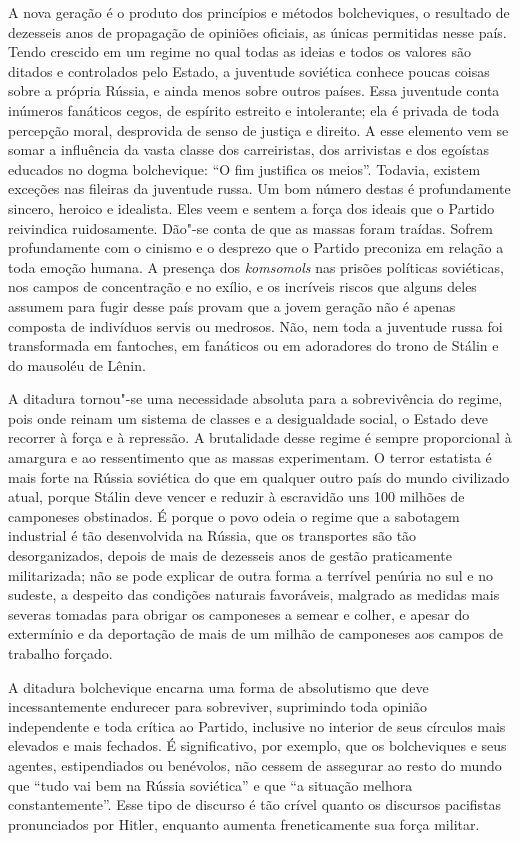 A nova geração é o produto dos princípios e métodos bolcheviques, o
resultado de dezesseis anos de propagação de opiniões oficiais, as únicas
permitidas nesse país. Tendo crescido em um regime no qual
todas as ideias e todos os valores são ditados e controlados pelo
Estado, a juventude soviética conhece poucas coisas sobre a própria
Rússia, e ainda menos sobre outros países. Essa juventude conta
inúmeros fanáticos cegos, de espírito estreito e intolerante; ela é
privada de toda percepção moral, desprovida de senso de justiça e
direito. A esse elemento vem se somar a influência da vasta classe dos
carreiristas, dos arrivistas e dos egoístas educados no dogma
bolchevique: “O fim justifica os meios”. Todavia, existem exceções nas
fileiras da juventude russa. Um bom número destas é profundamente
sincero, heroico e idealista. Eles veem e sentem a força dos ideais que
o Partido reivindica ruidosamente. Dão"-se conta de que as massas
foram traídas. Sofrem profundamente com o cinismo e o desprezo que o
Partido preconiza em relação a toda emoção humana. A presença dos
\textit{komsomols} nas prisões políticas soviéticas, nos campos de concentração
e no exílio, e os incríveis riscos que alguns deles assumem para fugir
desse país provam que a jovem geração não é apenas composta de
indivíduos servis ou medrosos. Não, nem toda a juventude russa foi
transformada em fantoches, em fanáticos ou em adoradores do trono de
Stálin e do mausoléu de Lênin.

A ditadura tornou"-se uma necessidade absoluta para a sobrevivência do
regime, pois onde reinam um sistema de classes e a desigualdade
social, o Estado deve recorrer à força e à repressão. A brutalidade desse
regime é sempre proporcional à amargura e ao ressentimento que as
massas experimentam. O terror estatista é mais forte na Rússia
soviética do que em qualquer outro país do mundo civilizado atual,
porque Stálin deve vencer e reduzir à escravidão uns 100 milhões de
camponeses obstinados. É porque o povo odeia o regime que a sabotagem
industrial é tão desenvolvida na Rússia, que os transportes são tão
desorganizados, depois de mais de dezesseis anos de gestão praticamente
militarizada; não se pode explicar de outra forma a terrível penúria no
sul e no sudeste, a despeito das condições naturais favoráveis,
malgrado as medidas mais severas tomadas para obrigar os camponeses a
semear e colher, e apesar do extermínio e da deportação de mais de um
milhão de camponeses aos campos de trabalho forçado.

A ditadura bolchevique encarna uma forma de absolutismo que deve
incessantemente endurecer para sobreviver, suprimindo toda opinião
independente e toda crítica ao Partido, inclusive no interior de seus
círculos mais elevados e mais fechados. É significativo, por exemplo,
que os bolcheviques e seus agentes, estipendiados ou benévolos, não
cessem de assegurar ao resto do mundo que “tudo vai bem na Rússia
soviética” e que “a situação melhora constantemente”. Esse tipo de
discurso é tão crível quanto os discursos pacifistas pronunciados por
Hitler, enquanto aumenta freneticamente sua força militar.

